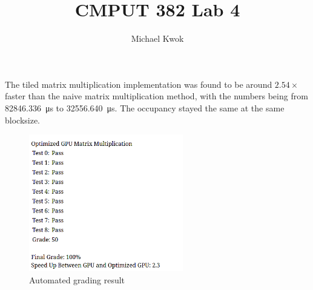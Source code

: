 \documentclass{article}
\title{CMPUT 382 Lab 4}
\author{Michael Kwok}
\begin{document}
\maketitle

The tiled matrix multiplication implementation was found to be around \( 2.54 \times \) faster than the naive matrix multiplication method, with the numbers being from \SI{82846.336}{\micro\second} to \SI{32556.640}{\micro\second}. The occupancy stayed the same at the same blocksize.


\begin{figure}[H]
    \centering
    \includegraphics[width=0.6\textwidth]{grading.png}
    \caption{Automated grading result}
\end{figure}
\end{document}
